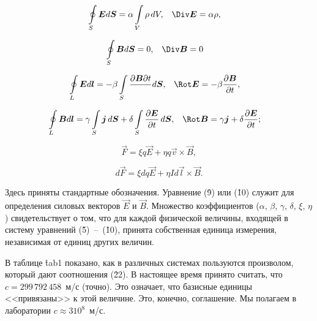 \begin{align}
	\oint_S \vec{E}d\vec{S} &= \alpha\int_V\rho\,dV, & \Div \vec{E} &= \alpha\rho,
\end{align}

\begin{align}
	\oint_S\vec{B}d\vec{S} &= 0, & \Div\vec{B} &= 0
\end{align}

\begin{align}
	\oint_L\vec{E}d\vec{l} &= -\beta\int_S\frac{\partial{\vec{B}} \partial t}\,d\vec{S}, & \Rot\vec{E} &= -\beta\frac{\partial\vec B}{\partial t},
\end{align}

\begin{align}
	\oint_L\vec{B}d\vec{l} &= \gamma\int_S\vec{j}\,d\vec{S}+\delta\int_S\frac{\partial{\vec{E}}}{\partial t}\,d\vec{S}, & \Rot\vec{B} &= \gamma\vec{j}+\delta\frac{\partial\vec E}{\partial t};
\end{align}

%

\begin{equation}
	\vec{F}=\xi q\vec{E}+\eta q\vec{v}\times\vec{B},
\end{equation}

\begin{equation}
	d\vec{F}=\xi dq\vec{E}+\eta Id\vec{l}\times\vec{B}.
\end{equation}

Здесь приняты стандартные обозначения. Уравнение (\r9) или (\r{10}) служит для определения силовых векторов $\vec{E}$ и
$\vec{B}$. Множество коэффициентов ($\alpha$, $\beta$, $\gamma$, $\delta$, $\xi$, $\eta$) свидетельствует о том, что для
каждой физической величины, входящей в систему уравнений (\r5)~--~(\r{10}), принята собственная единица измерения,
независимая от единиц других величин.


В таблице \r{tab1} показано, как в различных системах пользуются произволом, который дают соотношения (\r{22}). В
настоящее время принято считать, что $c=299\,792\,458$~м/с (точно). Это означает, что базисные единицы <<привязаны>> к
этой величине. Это, конечно, соглашение. Мы полагаем в лаборатории $c \approx 3 10^8$~м/с.

\def\pp{\textbf}

